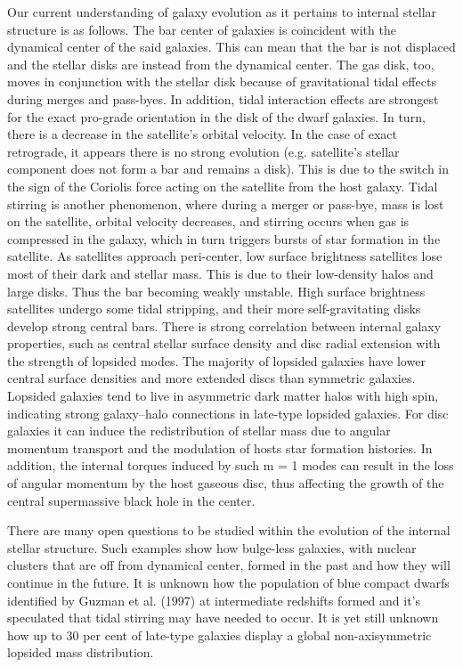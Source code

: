 \documentclass[linenumbers,trackchanges]{aastex7}
\begin{document}
Our current understanding of galaxy evolution as it pertains to internal stellar structure is as follows. The bar center of galaxies is coincident with the dynamical center of the said galaxies. This can mean that the bar is not displaced and the stellar disks are instead from the dynamical center. The gas disk, too, moves in conjunction with the stellar disk because of gravitational tidal effects during merges and pass-byes. In addition, tidal interaction effects are strongest for the exact pro-grade orientation in the disk of the dwarf galaxies. In turn, there is a decrease in the satellite's orbital velocity. In the case of exact retrograde, it appears there is no strong evolution (e.g. satellite’s stellar component does not form a bar and remains a disk). This is due to the switch in the sign of the Coriolis force acting on the satellite from the host galaxy. Tidal stirring is another phenomenon, where during a merger or pass-bye, mass is lost on the satellite, orbital velocity decreases, and stirring occurs when gas is compressed in the galaxy, which in turn triggers bursts of star formation in the satellite. As satellites approach peri-center, low surface brightness satellites lose most of their dark and stellar mass. This is due to their low-density halos and large disks. Thus the bar becoming weakly unstable. High surface brightness satellites undergo some tidal stripping, and their more self-gravitating disks develop strong central bars. There is strong correlation between internal galaxy properties, such as central stellar surface density and disc radial extension with the strength of lopsided modes. The majority of lopsided galaxies have lower central surface densities and more extended discs than symmetric galaxies. Lopsided galaxies tend to live in asymmetric dark matter halos with high spin, indicating strong galaxy–halo connections in late-type lopsided galaxies. For disc galaxies it can induce the redistribution of stellar mass due to angular momentum transport and the modulation of hosts star formation histories. In addition, the internal torques induced by such m = 1 modes can result in the loss of angular momentum by the host gaseous disc, thus affecting the growth of the central supermassive black hole in the center.

There are many open questions to be studied within the evolution of the internal stellar structure. Such examples show how bulge-less galaxies, with nuclear clusters that are off from dynamical center, formed in the past and how they will continue in the future. It is unknown how the population of blue compact dwarfs identified by Guzman et al. (1997) at intermediate redshifts formed and it's speculated that tidal stirring may have needed to occur. It is yet still unknown how up to 30 per cent of late-type galaxies display a global non-axisymmetric lopsided mass distribution. 
\end{document}
